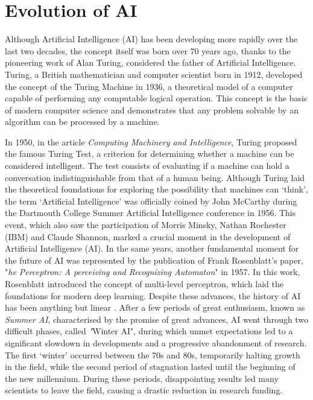 \section{Evolution of AI}
Although Artificial Intelligence (AI) has been developing more rapidly over the last two decades, the concept itself was born over 70 years ago, thanks to the pioneering work of Alan Turing, considered the father of Artificial Intelligence. Turing, a British mathematician and computer scientist born in 1912, developed the concept of the Turing Machine in 1936, a theoretical model of a computer capable of performing any computable logical operation. This concept is the basis of modern computer science and demonstrates that any problem solvable by an algorithm can be processed by a machine.

In 1950, in the article \textit{Computing Machinery and Intelligence}\cite{Turing1950}, Turing proposed the famous Turing Test, a criterion for determining whether a machine can be considered intelligent. The test consists of evaluating if a machine can hold a conversation indistinguishable from that of a human being.
Although Turing laid the theoretical foundations for exploring the possibility that machines can ‘think’, the term ‘Artificial Intelligence’ was officially coined by John McCarthy during the Dartmouth College Summer Artificial Intelligence conference in 1956. This event, which also saw the participation of Morris Minsky, Nathan Rochester (IBM) and Claude Shannon, marked a crucial moment in the development of Artificial Intelligence (AI)\cite{GRZYBOWSKI2024221}.
In the same years, another fundamental moment for the future of AI was represented by the publication of Frank Rosenblatt's paper, "\textit{he Perceptron: A perceiving and Recognizing Automaton}"\cite{Rosenblatt1957} in 1957.
In this work, Rosenblatt introduced the concept of multi-level perceptron, which laid the foundations for modern deep learning. Despite these advances, the history of AI has been anything but linear \cite{Toosi_2021}.
After a few periods of great enthusiasm, known as \textit{Summer AI}, characterised by the promise of great advances, AI went through two difficult phases, called \textit"{Winter AI}", during which unmet expectations led to a significant slowdown in developments and a progressive abandonment of research. The first ‘winter’ occurred between the 70s and 80s, temporarily halting growth in the field, while the second period of stagnation lasted until the beginning of the new millennium. During these periods, disappointing results led many scientists to leave the field, causing a drastic reduction in research funding.
